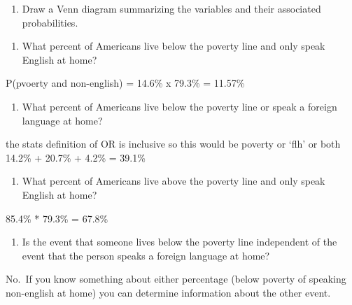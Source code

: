 \documentclass[]{article}
\newenvironment{Shaded}{\begin{snugshade}}{\end{snugshade}}
\newcommand{\NormalTok}[1]{#1}
\providecommand{\tightlist}{%
  \setlength{\itemsep}{0pt}\setlength{\parskip}{0pt}}
\begin{document}
\begin{enumerate}
\def\labelenumi{(\alph{enumi})}
\setcounter{enumi}{1}
\tightlist
\item
  Draw a Venn diagram summarizing the variables and their associated
  probabilities.
\end{enumerate}

\begin{Shaded}
\end{Shaded}

\begin{enumerate}
\def\labelenumi{(\alph{enumi})}
\setcounter{enumi}{2}
\tightlist
\item
  What percent of Americans live below the poverty line and only speak
  English at home?
\end{enumerate}

P(pvoerty and non-english) = 14.6\% x 79.3\% = 11.57\%

\begin{enumerate}
\def\labelenumi{(\alph{enumi})}
\setcounter{enumi}{3}
\tightlist
\item
  What percent of Americans live below the poverty line or speak a
  foreign language at home?
\end{enumerate}

the stats definition of OR is inclusive so this would be poverty or
`flh' or both 14.2\% + 20.7\% + 4.2\% = 39.1\%

\begin{enumerate}
\def\labelenumi{(\alph{enumi})}
\setcounter{enumi}{4}
\tightlist
\item
  What percent of Americans live above the poverty line and only speak
  English at home?
\end{enumerate}

85.4\% * 79.3\% = 67.8\%

\begin{enumerate}
\def\labelenumi{(\alph{enumi})}
\setcounter{enumi}{5}
\tightlist
\item
  Is the event that someone lives below the poverty line independent of
  the event that the person speaks a foreign language at home?
\end{enumerate}

No.~If you know something about either percentage (below poverty of
speaking non-english at home) you can determine information about the
other event.
\end{document}
